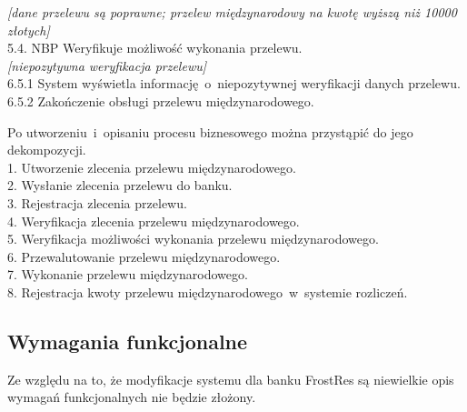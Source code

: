 \begin{flushleft}
\textit{{[}dane przelewu są poprawne; przelew międzynarodowy na kwotę wyższą niż 10000 złotych{]}}\\
\hspace{1ex}5.4. NBP Weryfikuje możliwość wykonania przelewu.\\
\hspace{1ex}\textit{{[}niepozytywna weryfikacja przelewu{]}}\\
\hspace{2ex}6.5.1 System wyświetla informację~o~niepozytywnej weryfikacji danych przelewu.\\
\hspace{2ex}6.5.2 Zakończenie obsługi przelewu międzynarodowego.\\ 
\end{flushleft}

\begin{flushleft}
Po utworzeniu~i~opisaniu procesu biznesowego można przystąpić do jego dekompozycji. \\
\hspace{1ex}1. Utworzenie zlecenia przelewu międzynarodowego.\\
\hspace{1ex}2. Wysłanie zlecenia przelewu do banku.\\
\hspace{1ex}3. Rejestracja zlecenia przelewu.\\
\hspace{1ex}4. Weryfikacja zlecenia przelewu międzynarodowego.\\
\hspace{1ex}5. Weryfikacja możliwości wykonania przelewu międzynarodowego.\\
\hspace{1ex}6. Przewalutowanie przelewu międzynarodowego.\\
\hspace{1ex}7. Wykonanie przelewu międzynarodowego.\\
\hspace{1ex}8. Rejestracja kwoty przelewu międzynarodowego~w~systemie rozliczeń.\\
\end{flushleft}

\subsection*{Wymagania funkcjonalne}
Ze względu na to, że modyfikacje systemu dla banku FrostRes są niewielkie opis wymagań funkcjonalnych nie będzie złożony. 


